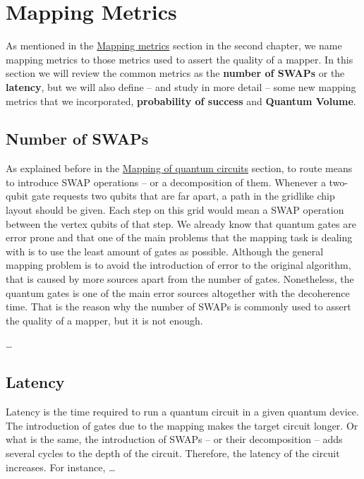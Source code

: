 \section*{Mapping Metrics}
\label{sec:org9ea4469}
As mentioned in the \href{chapter-2.org}{Mapping metrics} section in the second chapter, we name mapping metrics to those metrics used to assert the quality of a mapper.
In this section we will review the common metrics as the \textbf{number of SWAPs} or the \textbf{latency}, but we will also define -- and study in more detail -- some new mapping metrics that we incorporated, \textbf{probability of success} and \textbf{Quantum Volume}.

\subsection*{Number of SWAPs}
\label{sec:orgd63c431}

As explained before in the \href{chapter-2.org}{Mapping of quantum circuits} section, to route means to introduce SWAP operations -- or a decomposition of them.
Whenever a two-qubit gate requests two qubits that are far apart, a path in the gridlike chip layout should be given.
Each step on this grid would mean a SWAP operation between the vertex qubits of that step.
We already know that quantum gates are error prone and that one of the main problems that the mapping task is dealing with is to use the least amount of gates as possible.
Although the general mapping problem is to avoid the introduction of error to the original algorithm, that is caused by more sources apart from the number of gates.
Nonetheless, the quantum gates is one of the main error sources altogether with the decoherence time.
That is the reason why the number of SWAPs is commonly used to assert the quality of a mapper, but it is not enough.

\ldots{}

\subsection*{Latency}
\label{sec:org7944744}

Latency is the time required to run a quantum circuit in a given quantum device.
The introduction of gates due to the mapping makes the target circuit longer.
Or what is the same, the introduction of SWAPs -- or their decomposition -- adds several cycles to the depth of the circuit.
Therefore, the latency of the circuit increases.
For instance, \ldots{}

